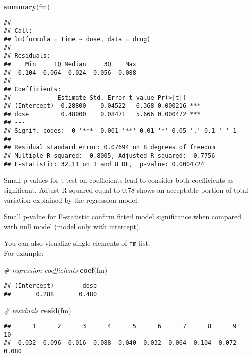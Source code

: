 \documentclass[]{book}
\newenvironment{Shaded}{\begin{snugshade}}{\end{snugshade}}
\newcommand{\KeywordTok}[1]{\textcolor[rgb]{0.13,0.29,0.53}{\textbf{{#1}}}}
\newcommand{\CommentTok}[1]{\textcolor[rgb]{0.56,0.35,0.01}{\textit{{#1}}}}
\newcommand{\NormalTok}[1]{{#1}}
\begin{document}
\begin{Shaded}
\begin{Highlighting}[]
\KeywordTok{summary}\NormalTok{(fm)}
\end{Highlighting}
\end{Shaded}

\begin{verbatim}
## 
## Call:
## lm(formula = time ~ dose, data = drug)
## 
## Residuals:
##    Min     1Q Median     3Q    Max 
## -0.104 -0.064  0.024  0.056  0.088 
## 
## Coefficients:
##             Estimate Std. Error t value Pr(>|t|)    
## (Intercept)  0.28800    0.04522   6.368 0.000216 ***
## dose         0.48000    0.08471   5.666 0.000472 ***
## ---
## Signif. codes:  0 '***' 0.001 '**' 0.01 '*' 0.05 '.' 0.1 ' ' 1
## 
## Residual standard error: 0.07694 on 8 degrees of freedom
## Multiple R-squared:  0.8005, Adjusted R-squared:  0.7756 
## F-statistic: 32.11 on 1 and 8 DF,  p-value: 0.0004724
\end{verbatim}

Small p-values for t-test on coefficients lead to consider both
coefficients as significant. Adjust R-squared equal to 0.78 shows an
acceptable portion of total variation explained by the regression model.

Small p-value for F-statistic confirm fitted model significance when
compared with null model (model only with intercept).

You can also visualize single elements of \texttt{fm} list.\\
For example:

\begin{Shaded}
\begin{Highlighting}[]
\CommentTok{# regression coefficients}
\KeywordTok{coef}\NormalTok{(fm)}
\end{Highlighting}
\end{Shaded}

\begin{verbatim}
## (Intercept)        dose 
##       0.288       0.480
\end{verbatim}

\begin{Shaded}
\begin{Highlighting}[]
\CommentTok{# residuals}
\KeywordTok{resid}\NormalTok{(fm)}
\end{Highlighting}
\end{Shaded}

\begin{verbatim}
##      1      2      3      4      5      6      7      8      9     10 
##  0.032 -0.096  0.016  0.088 -0.040  0.032  0.064 -0.104 -0.072  0.080
\end{verbatim}
\end{document}
